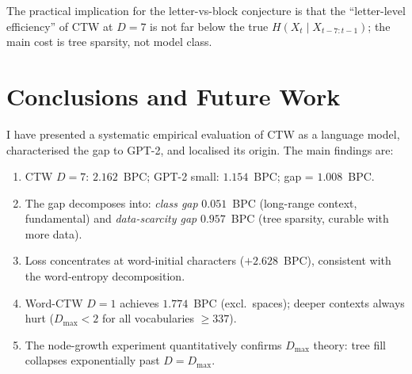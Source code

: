 \documentclass[11pt,a4paper]{article}
\newcommand{\dmax}{D_{\max}}
\begin{document}
The practical implication for the letter-vs-block conjecture is that
the ``letter-level efficiency'' of CTW at $D=7$ is not far below the
true $H(X_t \mid X_{t-7:t-1})$;
the main cost is tree sparsity, not model class.

\section{Conclusions and Future Work}
\label{sec:conclusion}

I have presented a systematic empirical evaluation of CTW
as a language model, characterised the gap to GPT-2,
and localised its origin.
The main findings are:

\begin{enumerate}[leftmargin=1.5em]
  \item CTW $D=7$: $2.162$~BPC; GPT-2 small: $1.154$~BPC;
        gap = $1.008$~BPC.
  \item The gap decomposes into:
        \emph{class gap} $0.051$~BPC (long-range context, fundamental)
        and \emph{data-scarcity gap} $0.957$~BPC (tree sparsity, curable with more data).
  \item Loss concentrates at word-initial characters ($+2.628$~BPC),
        consistent with the word-entropy decomposition.
  \item Word-CTW $D=1$ achieves $1.774$~BPC (excl.\ spaces);
        deeper contexts always hurt ($\dmax < 2$ for all vocabularies $\ge 337$).
  \item The node-growth experiment quantitatively confirms $\dmax$ theory:
        tree fill collapses exponentially past $D = \dmax$.
\end{enumerate}
\end{document}
